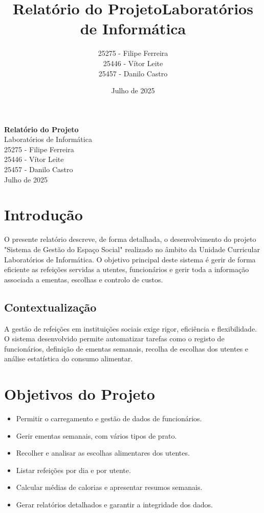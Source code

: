 \documentclass[a4paper,12pt]{report}
\title{Relatório do Projeto\newline Laboratórios de Informática}
\author{\begin{center}25275 - Filipe Ferreira\\25446 - Vítor Leite\\25457 - Danilo Castro\end{center}}
\date{Julho de 2025}
\begin{document}
{\begin{center}
    \vspace*{2cm}
    {\Huge \textbf{Relatório do Projeto}}\\[0.5cm]
    {\LARGE Laboratórios de Informática}\\[1cm]
    {\large 25275 - Filipe Ferreira}\\
    {\large 25446 - Vítor Leite}\\
    {\large 25457 - Danilo Castro}\\[1cm]
    {\large Julho de 2025}
    \vspace*{2cm}
\end{center}}
\tableofcontents
\cleardoublepage
{}
\renewcommand{\thefigure}{Imagem \arabic{figure}}
\listoffigures
\cleardoublepage
\chapter{Introdução}
O presente relatório descreve, de forma detalhada, o desenvolvimento do projeto "Sistema de Gestão do Espaço Social" realizado no âmbito da Unidade Curricular Laboratórios de Informática. O objetivo principal deste sistema é gerir de forma eficiente as refeições servidas a utentes, funcionários e gerir toda a informação associada a ementas, escolhas e controlo de custos.

\section{Contextualização}
A gestão de refeições em instituições sociais exige rigor, eficiência e flexibilidade. O sistema desenvolvido permite automatizar tarefas como o registo de funcionários, definição de ementas semanais, recolha de escolhas dos utentes e análise estatística do consumo alimentar.

\chapter{Objetivos do Projeto}
\begin{itemize}
    \item Permitir o carregamento e gestão de dados de funcionários.
    \item Gerir ementas semanais, com vários tipos de prato.
    \item Recolher e analisar as escolhas alimentares dos utentes.
    \item Listar refeições por dia e por utente.
    \item Calcular médias de calorias e apresentar resumos semanais.
    \item Gerar relatórios detalhados e garantir a integridade dos dados.
\end{itemize}
\end{document}

